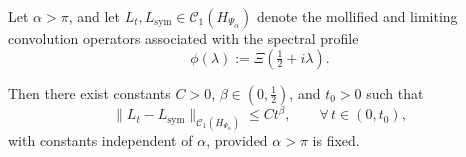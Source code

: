 \begin{lemma}
\label{lem:trace_norm_rate_convergence}
Let \( \alpha > \pi \), and let \( L_t, L_{\mathrm{sym}} \in \mathcal{C}_1(H_{\Psi_\alpha}) \) denote the mollified and limiting convolution operators associated with the spectral profile
\[
\phi(\lambda) := \Xi\left( \tfrac{1}{2} + i\lambda \right).
\]

Then there exist constants \( C > 0 \), \( \beta \in (0, \tfrac{1}{2}) \), and \( t_0 > 0 \) such that
\[
\| L_t - L_{\mathrm{sym}} \|_{\mathcal{C}_1(H_{\Psi_\alpha})} \le C t^\beta, \qquad \forall\, t \in (0, t_0),
\]
with constants independent of \( \alpha \), provided \( \alpha > \pi \) is fixed.
\end{lemma}
